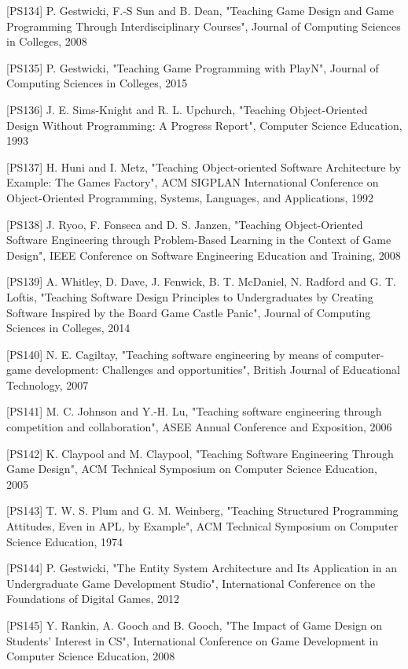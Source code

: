 [PS134]	P. Gestwicki, F.-S Sun and B. Dean, "Teaching Game Design and Game Programming Through Interdisciplinary Courses", Journal of Computing Sciences in Colleges, 2008

[PS135]	P. Gestwicki, "Teaching Game Programming with PlayN", Journal of Computing Sciences in Colleges, 2015

[PS136]	J. E. Sims-Knight and R. L. Upchurch, "Teaching Object-Oriented Design Without Programming: A Progress Report", Computer Science Education, 1993

[PS137]	H. Huni and I. Metz, "Teaching Object-oriented Software Architecture by Example: The Games Factory", ACM SIGPLAN International Conference on Object-Oriented Programming, Systems, Languages, and Applications,  1992

[PS138]	J. Ryoo, F. Fonseca and D. S. Janzen, "Teaching Object-Oriented Software Engineering through Problem-Based Learning in the Context of Game Design", IEEE Conference on Software Engineering Education and Training, 2008

[PS139]	A. Whitley, D. Dave, J. Fenwick, B. T. McDaniel, N. Radford and G. T. Loftis, "Teaching Software Design Principles to Undergraduates by Creating Software Inspired by the Board Game Castle Panic", Journal of Computing Sciences in Colleges, 2014

[PS140]	N. E. Cagiltay, "Teaching software engineering by means of computer-game development: Challenges and opportunities", British Journal of Educational Technology, 2007

[PS141]	M. C. Johnson and Y.-H. Lu, "Teaching software engineering through competition and collaboration", ASEE Annual Conference and Exposition, 2006

[PS142]	K. Claypool and M. Claypool, "Teaching Software Engineering Through Game Design", ACM Technical Symposium on Computer Science Education, 2005

[PS143]	T. W. S. Plum and G. M. Weinberg, "Teaching Structured Programming Attitudes, Even in APL, by Example", ACM Technical Symposium on Computer Science Education, 1974

[PS144]	P. Gestwicki, "The Entity System Architecture and Its Application in an Undergraduate Game Development Studio", International Conference on the Foundations of Digital Games, 2012

[PS145]	Y. Rankin, A. Gooch and B. Gooch, "The Impact of Game Design on Students' Interest in CS", International Conference on Game Development in Computer Science Education, 2008

